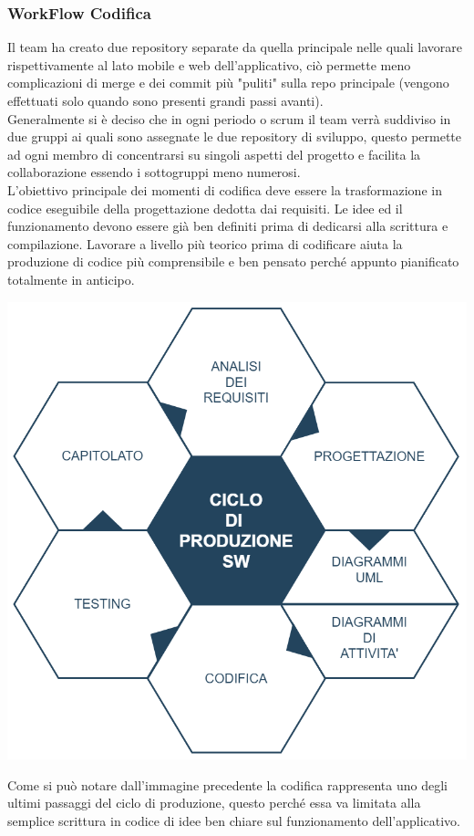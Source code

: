 \subsubsection{WorkFlow Codifica}
Il team ha creato due repository separate da quella principale nelle quali lavorare rispettivamente al lato mobile e web dell'applicativo, ciò permette meno complicazioni di merge e dei commit più "puliti" sulla repo principale (vengono effettuati solo quando sono presenti grandi passi avanti). \\[0.1cm]
Generalmente si è deciso che in ogni periodo o scrum il team verrà suddiviso in due gruppi ai quali sono assegnate le due repository di sviluppo, questo permette ad ogni membro di concentrarsi su singoli aspetti del progetto e facilita la collaborazione essendo i sottogruppi meno numerosi. 
\\[0.3cm]
L'obiettivo principale dei momenti di codifica deve essere la trasformazione in codice eseguibile della progettazione dedotta dai requisiti. Le idee ed il funzionamento devono essere già ben definiti prima di dedicarsi alla scrittura e compilazione. Lavorare a livello più teorico prima di codificare aiuta la produzione di codice più comprensibile e ben pensato perché appunto pianificato totalmente in anticipo.\\
\begin{center}
\includegraphics[scale=0.3]{img/scheminoCodifica.png}
\end{center}
Come si può notare dall'immagine precedente la codifica rappresenta uno degli ultimi passaggi del ciclo di produzione, questo perché essa va limitata alla semplice scrittura in codice di idee ben chiare sul funzionamento dell'applicativo.

